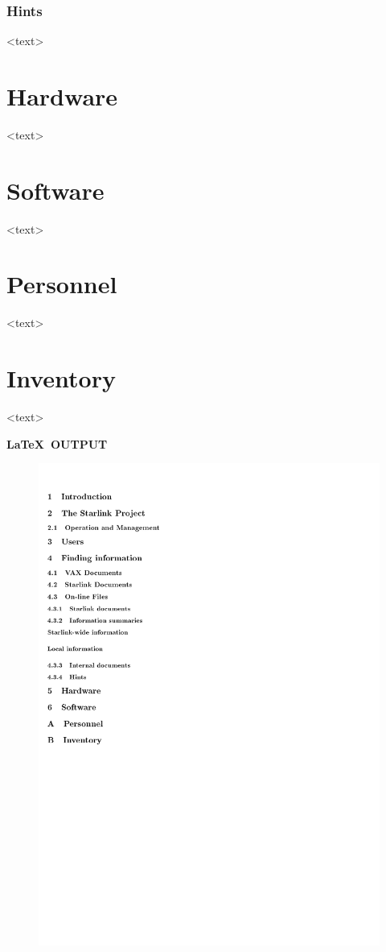\documentclass[twoside,11pt]{starlink}
\begin{document}
\begin{terminalv}
\subsubsection{Hints}
     <text>
\section{Hardware}
     <text>
\section{Software}
     <text>
\appendix
\section{Personnel}
     <text>
\section{Inventory}
     <text>
\end{terminalv}

\newpage

\begin{center}
  \textbf{\LaTeX\ OUTPUT}
  \begin{figure}[h]
    \includegraphics[viewport=0 350 215 842]{sc9a}
  \end{figure}
\end{center}
\end{document}
